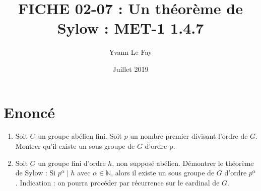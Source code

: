 \documentclass{article}
\begin{document}
\title{FICHE 02-07 : Un théorème de Sylow : MET-1 1.4.7}
\author{Yvann Le Fay}
\date{Juillet 2019}
\maketitle
\section*{Enoncé}
\begin{enumerate}
\item Soit $G$ un groupe abélien fini. Soit $p$ un nombre premier divisant l'ordre de $G$. Montrer qu'il existe un sous groupe de $G$ d'ordre p. 
\item Soit $G$ un groupe fini d'ordre $h$, non supposé abélien. Démontrer le théorème de Sylow : Si $p^{\alpha}\mid h$ avec $\alpha \in \mathbb{N}$, alors il existe un sous groupe de $G$ d'ordre $p^{\alpha}$. Indication : on pourra procéder par récurrence sur le cardinal de $G$.
\end{enumerate}
\end{document}
